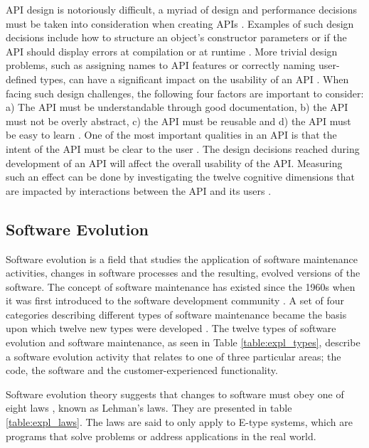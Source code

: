\documentclass{sig-alternate}
\begin{document}
API design is notoriously difficult, a myriad of design and performance decisions must be taken into consideration when creating APIs \cite{afonso2012evaluating, bloch2008effective, stylos2006comparing}. Examples of such design decisions include how to structure an object's constructor parameters or if the API should display errors at compilation or at runtime \cite{stylos2006comparing}. More trivial design problems, such as assigning names to API features or correctly naming user-defined types, can have a significant impact on the usability of an API \cite{shi2011empirical}. When facing such design challenges, the following four factors are important to consider: a) The API must be understandable through good documentation, b) the API must not be overly abstract, c) the API must be reusable and d) the API must be easy to learn \cite{shi2011empirical}. One of the most important qualities in an API is that the intent of the API must be clear to the user \cite{stylos2006comparing, shi2011empirical}. The design decisions reached during development of an API will affect the overall usability of the API. Measuring such an effect can be done by investigating the twelve cognitive dimensions that are impacted by interactions between the API and its users \cite{clarke2004measuring}. 


\subsection{Software Evolution} \label{software_evolution}
Software evolution is a field that studies the application of software maintenance activities, changes in software processes and the resulting, evolved versions of the software. The concept of software maintenance has existed since the 1960s when it was first introduced to the software development community \cite{lientz1980software}. A set of four categories describing different types of software maintenance \cite{lientz1980software} became the basis upon which twelve new types were developed \cite{chapin2001types}. The twelve types of software evolution and software maintenance, as seen in Table \ref{table:expl_types}, describe a software evolution activity that relates to one of three particular areas; the code, the software and the customer-experienced functionality. 

Software evolution theory suggests that changes to software must obey one of eight laws \cite{lehman90sview}, known as Lehman's laws. They are presented in table \ref{table:expl_laws}. The laws are said to only apply to E-type systems, which are programs that solve problems or address applications in the real world.     
\end{document}
